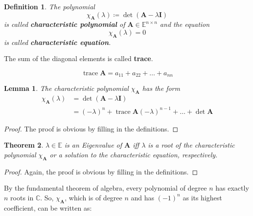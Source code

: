 \documentclass[a4paper,12pt]{article}
\newcommand{\E}{\mathbb{E}}
\newcommand{\C}{\mathbb{C}}
\newcommand{\I}{\mat{I}}
\newcommand{\A}{\mat{A}}
\newcommand{\trace}{\operatorname{trace}}
\newcommand{\charp}[1]{\chi_{#1}}
\newcommand{\mat}[1]{\mathbf{#1}}
\theoremstyle{plain}
\newtheorem{defn}{Definition}[section]
\newtheorem{lemma}{Lemma}[section]
\newtheorem{theorem}[lemma]{Theorem}
\numberwithin{equation}{section}
\begin{document}
\begin{defn}
    The polynomial
    \begin{equation}
        \charp{\A}(\lambda) \coloneqq \det (\A - \lambda \I)
    \end{equation}
    is called \textbf{characteristic polynomial} of $\A \in \E^{n \times n}$ and
    the equation
    \begin{equation}
        \charp{\A}(\lambda) = 0
    \end{equation}
    is called \textbf{characteristic equation}.
\end{defn}

The sum of the diagonal elements is called \textbf{trace}.

\begin{equation}
    \trace \A = a_{11} + a_{22} + \dots + a_{nn}
\end{equation}

\begin{lemma}
    \label{lem:charp-form}
    The characteristic polynomial $\charp{\A}$ has the form
    \begin{equation}
        \begin{split}
            \charp{\A}(\lambda) &= \det (\A - \lambda \I) \\
            &= (-\lambda)^{n} + \trace \A (-\lambda)^{n-1} + \dots + \det \A
        \end{split}
    \end{equation}
\end{lemma}

\begin{proof}
    The proof is obvious by filling in the definitions.
\end{proof}

\begin{theorem}
    \label{the:ev-is-root}
    $\lambda \in \E$ is an Eigenvalue of $\A$ iff $\lambda$ is a root of the
    characteristic polynomial $\charp{\A}$ or a solution to the characteristic
    equation, respectively.
\end{theorem}

\begin{proof}
    Again, the proof is obvious by filling in the definitions.
\end{proof}

By the fundamental theorem of algebra, every polynomial of degree $n$ has
exactly $n$ roots in $\C$. So, $\charp{\A}$, which is of degree $n$ and has $(-1)^{n}$ as its highest
coefficient, can be written as:
\end{document}
